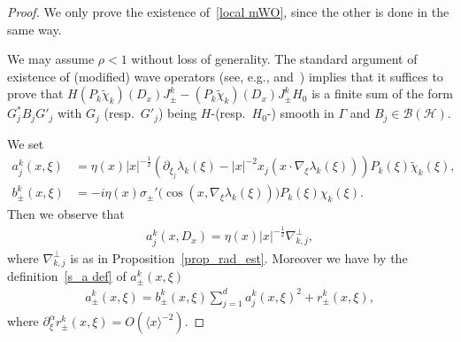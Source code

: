 \documentclass[10pt,a4paper]{amsart}
\renewcommand{\a}{\alpha}
\renewcommand{\l}{\lambda}
\newcommand{\x}{\xi}
\newcommand{\y}{\eta}
\newcommand{\s}{\sigma}
\newcommand{\HS}{\mathcal{H}}
\newcommand{\BS}{\mathcal{B}}
\newcommand{\jap}[1]{\langle #1 \rangle}
\begin{document}
\begin{proof}
We only prove the existence of~\eqref{local mWO}, since the other is done in the same way.

We may assume $\rho<1$ without loss of generality. The standard argument of existence of (modified) wave operators (see, e.g., \cite[Lemmas~10.2.1 and 10.2.2, Theorem~0.5.4]{Y} and~\cite[Theorem~XIII. 24]{R-S4}) implies that it suffices to prove that $H (P_k \tilde\chi_k)(D_x)J_\pm^k - (P_k \tilde\chi_k)(D_x)J_\pm^k H_0$ is a finite sum of the form $G_j^* B_j G'_j$ with $G_j$ (resp.\ $G'_j$) being $H$-(resp.\ $H_0$-) smooth in $\Gamma$ and $B_j\in\BS(\HS)$.

We set
\begin{align*}
a_j^k(x,\x) &= \y(x)|x|^{-\frac{1}{2}}\left(\partial_{\x_j}\l_k(\x)-|x|^{-2} x_j \left(x\cdot\nabla_\x\l_k(\x)\right)\right) P_k(\x) \tilde\chi_k(\x), \\
b_{\pm}^k(x,\x) &= -i \y(x)\s_\pm'\bigl(\cos(x,\nabla_\x\lambda_k(\x)) \bigr) P_k(\x) \chi_k(\x).
\end{align*}
Then we observe that
\begin{align*}
a_j^k(x,D_x)=\y(x)|x|^{-\frac12}\nabla_{k,j}^\perp,
\end{align*}
where $\nabla_{k,j}^\perp$ is as in Proposition~\ref{prop_rad_est}. Moreover we have by the definition~\eqref{s_a def} of $a_\pm^k(x,\x)$
\begin{align*}
a_\pm^k(x,\x)=b_\pm^k(x,\x) \sum_{j=1}^d a_j^k(x,\x)^2 + r_\pm^k(x,\x),
\end{align*}
where $\partial_\x^\a r_\pm^k(x,\x) = O(\jap{x}^{-2})$.


\end{proof}
\end{document}
